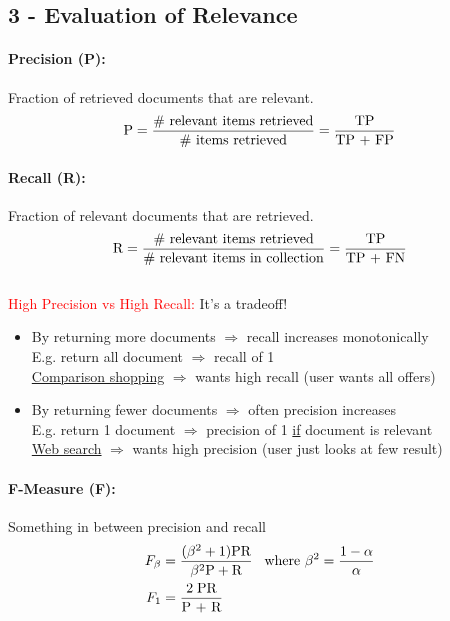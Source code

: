 \documentclass[a4paper,11pt]{article}
\newcommand{\msection}[1]{\section{#1}\vspace{-0.5mm}}
\begin{document}
\begin{multicols}{2}
\msection{3 - Evaluation of Relevance}
\paragraph{Precision (P):} Fraction of retrieved documents that are relevant.
\[
  \text P = \frac{\# \text{ relevant items retrieved}}{\# \text{ items retrieved}} 
          = \frac{\text{TP}}{\text{TP + FP}}
\]

\paragraph{Recall (R):} Fraction of relevant documents that are retrieved.\\
\[
  \text R = \frac{\# \text{ relevant items retrieved}}{\# \text{ relevant items in collection}}
          = \frac{\text{TP}}{\text{TP + FN}}
\]
\\
\vspace{0.2cm}
\textcolor{red}{High Precision vs High Recall:} It's a tradeoff!
\begin{itemize}
  \item By returning more documents $\Rightarrow$ recall increases monotonically\\
        E.g. return all document $\Rightarrow$ recall of 1\\
        \underline{Comparison shopping} $\Rightarrow$ wants high recall (user wants all offers)
  \item By returning fewer documents $\Rightarrow$ often precision increases\\
        E.g. return 1 document $\Rightarrow$ precision of 1 \underline{if} document is relevant\\
        \underline{Web search} $\Rightarrow$ wants high precision (user just looks at few result)
\end{itemize}

\paragraph{F-Measure (F):} Something in between precision and recall
\begin{align*}
  F_{\beta} &= \frac{(\beta^2 + 1) \text{PR}}{\beta^2 \text P + \text R} \hspace{0.3cm} \text{where } \beta^2 = \frac{1 - \alpha}{\alpha} \\
  F_1 &= \frac{2 \; \text{PR}}{\text{P + R}}
\end{align*}


\end{multicols}
\end{document}

